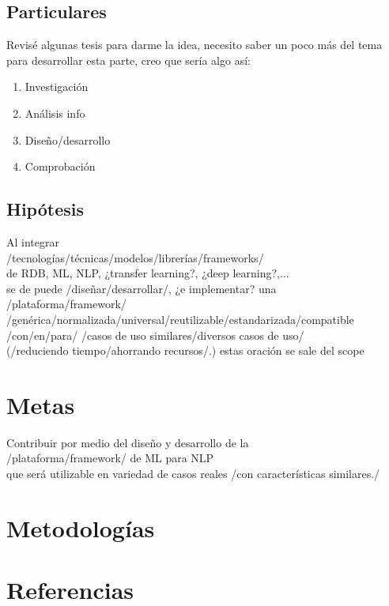\documentclass[letterpaper]{article}
\begin{document}
\subsection {Particulares}
Revisé algunas tesis para darme la idea, necesito saber un poco más del tema para desarrollar esta parte, creo que sería algo así:
\begin{enumerate}
    \item Investigación
    \item Análisis info
    \item Diseño/desarrollo
    \item Comprobación
\end{enumerate}
\subsection {Hipótesis}
Al integrar\\
/tecnologías/técnicas/modelos/librerías/frameworks/\\
de RDB, ML, NLP, ¿transfer learning?, ¿deep learning?,...\\
se de puede /diseñar/desarrollar/, ¿e implementar? una\\
/plataforma/framework/\\
/genérica/normalizada/universal/reutilizable/estandarizada/compatible\\
/con/en/para/ /casos de uso similares/diversos casos de uso/\\
(/reduciendo tiempo/ahorrando recursos/.) estas oración se sale del scope

\section {Metas}
Contribuir por medio del diseño y desarrollo de la\\
/plataforma/framework/ de ML para NLP\\
que será utilizable en variedad de casos reales /con características similares./
\section {Metodologías}
\newpage
\renewcommand{\listfigurename}{Índice de figuras (imágenes, fotos, \texttt{[image: shrug]})} %
\listoffigures
\renewcommand{\listtablename}{Índice de cuadros (plots, gráficas, charts)} %
\listoftables
\newpage
\section {Referencias}
\printbibliography[heading=none]
\end{document}
